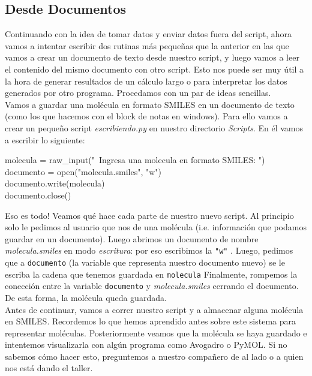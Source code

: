 \documentclass[10pt,letterpaper]{article}
\newcommand{\inlinecode}[1]{
\colorbox{light-gray}{\texttt{#1}}
}
\newenvironment{Code}
{
\begin{lrbox}{\selvestebox}%
\begin{minipage}{\dimexpr\columnwidth-2\fboxsep\relax}
\fontfamily{\ttdefault}\selectfont
}
{\end{minipage}\end{lrbox}%
\begin{center}
\colorbox{light-gray}{\usebox{\selvestebox}}
\end{center}
}
\begin{document}
\subsection{Desde Documentos}
Continuando con la idea de tomar datos y enviar datos fuera del script, ahora vamos a intentar escribir dos rutinas m\'as peque\~nas que la anterior en las que vamos a crear un documento de texto desde nuestro script, y luego vamos a leer el contenido del mismo documento con otro script. Esto nos puede ser muy \'util a la hora de generar resultados de un c\'alculo largo o para interpretar los datos generados por otro programa. Procedamos con un par de ideas sencillas.\\

Vamos a guardar una mol\'ecula en formato SMILES en un documento de texto (como los que hacemos con el block de notas en windows). Para ello vamos a crear un peque\~no script \textit{escribiendo.py} en nuestro directorio \textit{Scripts}. En \'el vamos a escribir lo siguiente:

\begin{Code}
molecula = raw\_input("\ \hspace{-2mm}Ingresa una molecula en formato SMILES: ")\\
documento = open("molecula.smiles", "w")\\
documento.write(molecula)\\
documento.close()
\end{Code}

Eso es todo! Veamos qu\'e hace cada parte de nuestro nuevo script. Al principio solo le pedimos al usuario que nos de una mol\'ecula (i.e. informaci\'on que podamos guardar en un documento). Luego abrimos un documento de nombre \textit{molecula.smiles} en modo \emph{escritura}: por eso escribimos la \inlinecode{"w"}. Luego, pedimos que a \inlinecode{documento} (la variable que representa nuestro documento nuevo) se le escriba la cadena que tenemos guardada en \inlinecode{molecula} Finalmente, rompemos la conecci\'on entre la variable \inlinecode{documento} y \textit{molecula.smiles} cerrando el documento. De esta forma, la mol\'ecula queda guardada.\\

Antes de continuar, vamos a correr nuestro script y a almacenar alguna mol\'ecula en SMILES. Recordemos lo que hemos aprendido antes sobre este sistema para representar mol\'eculas. Posteriormente veamos que la mol\'ecula se haya guardado e intentemos visualizarla con alg\'un programa como Avogadro o PyMOL. Si no sabemos c\'omo hacer esto, preguntemos a nuestro compa\~nero de al lado o a quien nos est\'a dando el taller.\\
\end{document}
